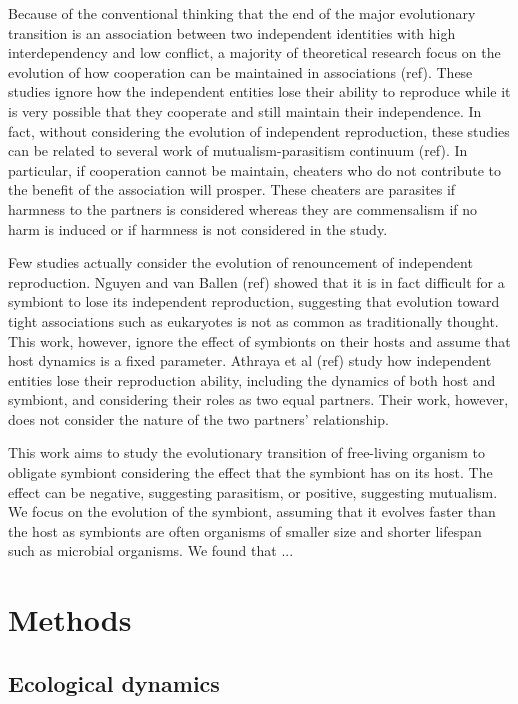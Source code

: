 \documentclass[11pt]{article}
\begin{document}
Because of the conventional thinking that the end of the major evolutionary transition is an association between two independent identities with high interdependency and low conflict, a majority of theoretical research focus on the evolution of how cooperation can be maintained in associations (ref).
These studies ignore how the independent entities lose their ability to reproduce while it is very possible that they cooperate and still maintain their independence. 
In fact, without considering the evolution of independent reproduction, these studies can be related to several work of mutualism-parasitism continuum (ref).
In particular, if cooperation cannot be maintain, cheaters who do not contribute to the benefit of the association will prosper.
These cheaters are parasites if harmness to the partners is considered whereas they are commensalism if no harm is induced or if harmness is not considered in the study.


Few studies actually consider the evolution of renouncement of independent reproduction. Nguyen and van Ballen (ref) showed that it is in fact difficult for a symbiont to lose its independent reproduction, suggesting that evolution toward tight associations such as eukaryotes is not as common as traditionally thought.
This work, however, ignore the effect of symbionts on their hosts and assume that host dynamics is a fixed parameter.
Athraya et al (ref) study how independent entities lose their reproduction ability, including the dynamics of both host and symbiont, and considering their roles as two equal partners.
Their work, however, does not consider the nature of the two partners' relationship.

This work aims to study the evolutionary transition of free-living organism to obligate symbiont considering the effect that the symbiont has on its host.
The effect can be negative, suggesting parasitism, or positive, suggesting mutualism.
We focus on the evolution of the symbiont, assuming that it evolves faster than the host as symbionts are often organisms of smaller size and shorter lifespan such as microbial organisms.
We found that ...


\section*{Methods}

\subsection*{Ecological dynamics}
\end{document}
